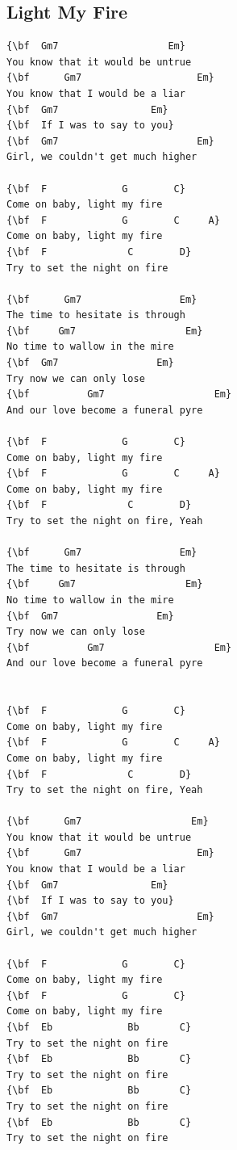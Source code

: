 \documentclass[a4paper]{article}
\begin{document}
\subsection{Light My Fire}
\begin{multicols}{2}\begin{Verbatim}[commandchars=\\\{\}]
{\bf  Gm7                   Em}
You know that it would be untrue
{\bf      Gm7                    Em}
You know that I would be a liar
{\bf  Gm7                Em}
{\bf  If I was to say to you}
{\bf  Gm7                        Em}
Girl, we couldn't get much higher

{\bf  F             G        C}
Come on baby, light my fire
{\bf  F             G        C     A}
Come on baby, light my fire
{\bf  F              C        D}
Try to set the night on fire

{\bf      Gm7                 Em}
The time to hesitate is through
{\bf     Gm7                   Em}
No time to wallow in the mire
{\bf  Gm7                 Em}
Try now we can only lose
{\bf          Gm7                   Em}
And our love become a funeral pyre

{\bf  F             G        C}
Come on baby, light my fire
{\bf  F             G        C     A}
Come on baby, light my fire
{\bf  F              C        D}
Try to set the night on fire, Yeah

{\bf      Gm7                 Em}
The time to hesitate is through
{\bf     Gm7                   Em}
No time to wallow in the mire
{\bf  Gm7                 Em}
Try now we can only lose
{\bf          Gm7                   Em}
And our love become a funeral pyre


{\bf  F             G        C}
Come on baby, light my fire
{\bf  F             G        C     A}
Come on baby, light my fire
{\bf  F              C        D}
Try to set the night on fire, Yeah

{\bf      Gm7                   Em}
You know that it would be untrue
{\bf      Gm7                    Em}
You know that I would be a liar
{\bf  Gm7                Em}
{\bf  If I was to say to you}
{\bf  Gm7                        Em}
Girl, we couldn't get much higher

{\bf  F             G        C}
Come on baby, light my fire
{\bf  F             G        C}
Come on baby, light my fire
{\bf  Eb             Bb       C}
Try to set the night on fire
{\bf  Eb             Bb       C}
Try to set the night on fire
{\bf  Eb             Bb       C}
Try to set the night on fire
{\bf  Eb             Bb       C}
Try to set the night on fire 

\end{Verbatim}
\end{multicols}\newpage
\end{document}
